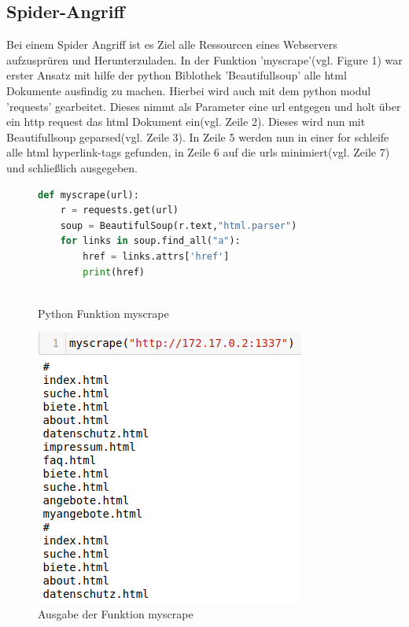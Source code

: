 \documentclass[12pt]{article}
\begin{document}
\subsection{Spider-Angriff}
Bei einem Spider Angriff ist es Ziel alle Ressourcen eines Webservers aufzusprüren und Herunterzuladen.
In der Funktion 'myscrape'(vgl. Figure 1) war erster Ansatz mit hilfe der python Biblothek 'Beautifullsoup' alle html Dokumente ausfindig zu machen.
Hierbei wird auch mit dem python modul 'requests' gearbeitet. Dieses nimmt als Parameter eine url entgegen und holt über ein http request das html Dokument ein(vgl. Zeile 2). Dieses wird nun mit Beautifullsoup geparsed(vgl. Zeile 3). In Zeile 5 werden nun in einer for schleife alle html hyperlink-tags gefunden, in Zeile 6 auf die urls minimiert(vgl. Zeile 7) und schließlich ausgegeben.
\begin{figure}[h]
 \caption{Python Funktion myscrape}
 \begin{lstlisting}[language=python, style=code]
 def myscrape(url):
 	r = requests.get(url)
 	soup = BeautifulSoup(r.text,"html.parser")
  	for links in soup.find_all("a"):
	 	href = links.attrs['href']
	 	print(href)
  
 \end{lstlisting}

\end{figure}
\begin{figure}[h]
 \caption{Ausgabe der Funktion myscrape}
 \centering
 \vspace{3mm}
 \includegraphics[scale=0.4]{data/myscrape.png}
 \end{figure}
\end{document}
